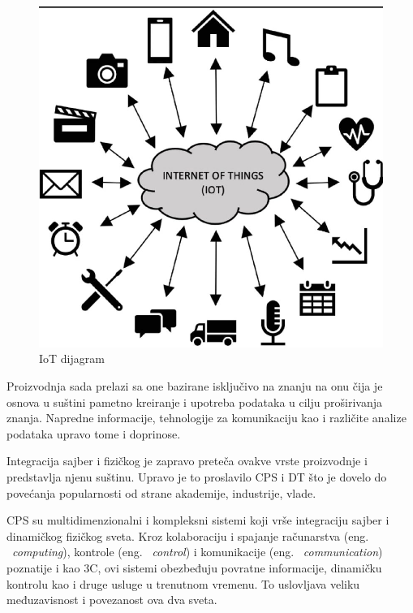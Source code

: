\documentclass[a4paper]{article}
\begin{document}
{\begin{figure}[h!]
	\begin{center}
		\includegraphics[scale=0.2]{1_internet_of_things.jpg}
	\end{center}
	\caption{IoT dijagram \cite{enablingtechnologies}}
\end{figure}

Proizvodnja sada prelazi sa one bazirane isključivo na znanju na onu čija je osnova u suštini
pametno kreiranje i upotreba podataka u cilju proširivanja znanja. Napredne informacije,
tehnologije za komunikaciju kao i različite analize podataka upravo tome i doprinose.\cite{digitaltwins}

Integracija sajber i fizičkog je zapravo preteča ovakve vrste proizvodnje i predstavlja njenu
suštinu. Upravo je to proslavilo CPS i DT što je dovelo do povećanja popularnosti od strane
akademije, industrije, vlade.\cite{digitaltwins}

CPS su multidimenzionalni i kompleksni sistemi koji vrše integraciju sajber i dinamičkog
fizičkog sveta. Kroz kolaboraciju i spajanje računarstva (eng. ~{\em computing}), kontrole (eng. ~{\em control}) i komunikacije (eng. ~{\em communication}) poznatije i kao
3C, ovi sistemi obezbeđuju povratne informacije, dinamičku kontrolu kao i druge usluge u
trenutnom vremenu. To uslovljava veliku međuzavisnost i povezanost ova dva sveta.\cite{digitaltwins}

}
\end{document}

